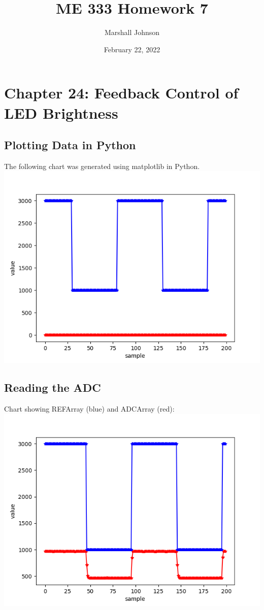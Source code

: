 \documentclass{article}
\title{ME 333 Homework 7}
\author{Marshall Johnson}
\date{February 22, 2022}
\begin{document}
\maketitle

\section*{Chapter 24: Feedback Control of LED Brightness}

\setcounter{section}{24}
\setcounter{subsection}{4}
\subsection{Plotting Data in Python}
The following chart was generated using matplotlib in Python. \\

\includegraphics[width=\linewidth]{matplotlib.png}

\pagebreak
\setcounter{subsection}{6}
\subsection{Reading the ADC}
Chart showing REFArray (blue) and ADCArray (red): \\

\includegraphics[width=\linewidth]{reading_the_adc.png}
\end{document}
